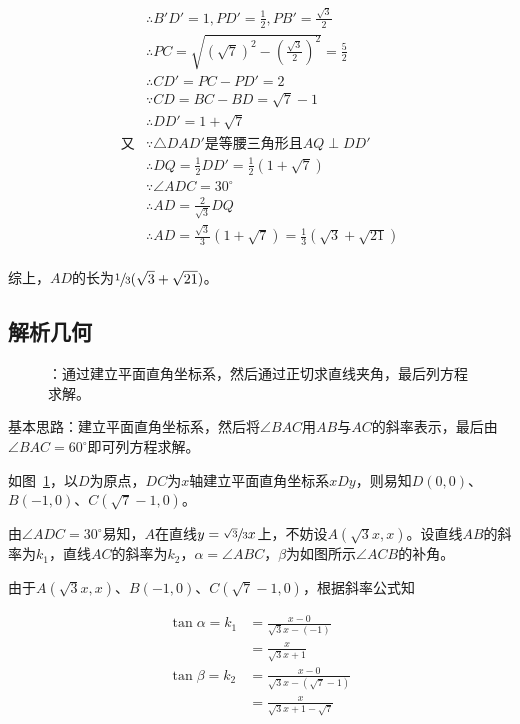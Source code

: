 \begin{align*}
  &\therefore B'D' = 1, PD' = \frac12, PB' = \frac{\sqrt3}2 \\
  &\therefore PC = \sqrt{(\sqrt7)^2 - \left(\frac{\sqrt3}2\right)^2} = \frac52 \\
  &\therefore CD' = PC - PD' = 2 \\
  &\because   CD = BC - BD = \sqrt7 - 1 \\
  &\therefore DD' = 1 + \sqrt7 \\
  \text{又}&\because \triangle DAD'\text{是等腰三角形且}AQ \perp DD' \\
  &\therefore DQ = \frac12DD' = \frac12(1 + \sqrt7) \\
  &\because   \angle ADC = 30^\circ \\
  &\therefore AD = \frac2{\sqrt3}DQ \\
  &\therefore AD = \frac{\sqrt3}3(1 + \sqrt7) = \frac13(\sqrt3 + \sqrt{21}) \\
\end{align*}

综上，$AD$的长为$\sfrac13(\sqrt3 + \sqrt{21})$。\footnotemark

\subsection{解析几何} \label{subsec:0049-dec}

\begin{figure}[htbp]
  \centering
  \caption{：通过建立平面直角坐标系，然后通过正切求直线夹角，最后列方程求解。}
  \label{fig:0049-dec}
\end{figure}

基本思路：建立平面直角坐标系，然后将$\angle BAC$用$AB$与$AC$的斜率表示，最后由$\angle BAC = 60^\circ$即可列方程求解。

如图~\ref{fig:0049-dec}，以$D$为原点，$DC$为$x$轴建立平面直角坐标系$xDy$，则易知$D(0, 0)$、$B(-1, 0)$、$C(\sqrt7 - 1, 0)$。

由$\angle ADC = 30^\circ$易知，$A$在直线$y = \sfrac{\sqrt3}3x$上，不妨设$A(\sqrt3x, x)$。设直线$AB$的斜率为$k_1$，直线$AC$的斜率为$k_2$，$\alpha = \angle ABC$，$\beta$为如图所示$\angle ACB$的补角。

由于$A(\sqrt3x, x)$、$B(-1, 0)$、$C(\sqrt7 - 1, 0)$，根据斜率公式知

\begin{align*}
  \tan\alpha = k_1 &= \frac{x - 0}{\sqrt3x - (-1)} \\
  &= \frac x{\sqrt3x + 1} \\
  \tan\beta = k_2 &= \frac{x - 0}{\sqrt3x - (\sqrt7 - 1)} \\
  &= \frac x{\sqrt3x + 1 - \sqrt7} \\
\end{align*}

